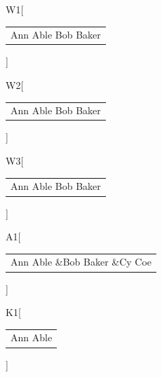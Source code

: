 \documentclass{article}
\makeatletter
\providecommand\lx@fm@separators[1]{\begin{tabular}[t]{c}#1\end{tabular}}
\newcommand\sep[1]{[\lx@fm@separators{#1}]}
\newcommand\aut{Ann Able \and Bob Baker}
\makeatother
\begin{document}
{\def\and{\unskip\enspace{\normalfont and}\enspace}\let\nx\and
W1\sep{Ann Able \and Bob Baker}

W2\sep{Ann Able \nx Bob Baker}

W3\sep{\aut}

}
{\def\and{\unskip\enspace\&\enspace}
A1\sep{Ann Able \and Bob Baker \and Cy Coe}

}
K1\sep{Ann Able \and Bob Baker}
\end{document}
